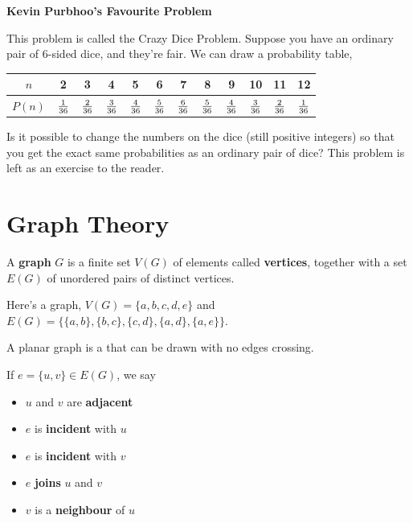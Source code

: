 \documentclass[english, 11pt]{article}
\begin{document}
\textbf{Kevin Purbhoo's Favourite Problem}

This problem is called the Crazy Dice Problem. Suppose you have an ordinary pair of 6-sided dice, and they're fair. We can draw a probability table,
\begin{center}
\begin{tabular}{c | c | c | c | c | c | c | c |c|c|c|c}
$n$ & 2 & 3 & 4 & 5 & 6 & 7 & 8 & 9 & 10 & 11 & 12 \\
\hline
$P(n)$ & $\frac{1}{36}$ & $\frac{2}{36}$ & $\frac{3}{36}$ & $\frac{4}{36}$ & $\frac{5}{36}$ & $\frac{6}{36}$ & $\frac{5}{36}$ & $\frac{4}{36}$ & $\frac{3}{36}$ & $\frac{2}{36}$ & $\frac{1}{36}$
\end{tabular}
\end{center}
Is it possible to change the numbers on the dice (still positive integers) so that you get the exact same probabilities as an ordinary pair of dice? This problem is left as an exercise to the reader.

\section{Graph Theory}

\begin{defn}[graph]\label{graph}
A \textbf{graph} $G$ is a finite set $V(G)$ of elements called \textbf{vertices}, together with a set $E(G)$ of unordered pairs of distinct vertices.
\end{defn}
\begin{exmp}
  Here's a graph, $V(G) = \{a,b,c,d,e\}$ and $E(G) = \{ \{a,b\}, \{b,c\}, \{c,d\}, \{a,d\}, \{a,e\}\}$.

  \begin{center}
\end{center}
\begin{defn}\label{planar graph}
A planar graph is a  that can be drawn with no edges crossing.
\end{defn}
\end{exmp}
\begin{defn}[terminology]\label{terminology}
If $e = \{u,v\} \in E(G)$, we say
\begin{itemize}
  \item $u$ and $v$ are \textbf{adjacent}
  \item $e$ is \textbf{incident} with $u$
  \item $e$ is \textbf{incident} with $v$
  \item $e$ \textbf{joins} $u$ and $v$
  \item $v$ is a \textbf{neighbour} of $u$
\end{itemize}
\end{defn}
\end{document}
